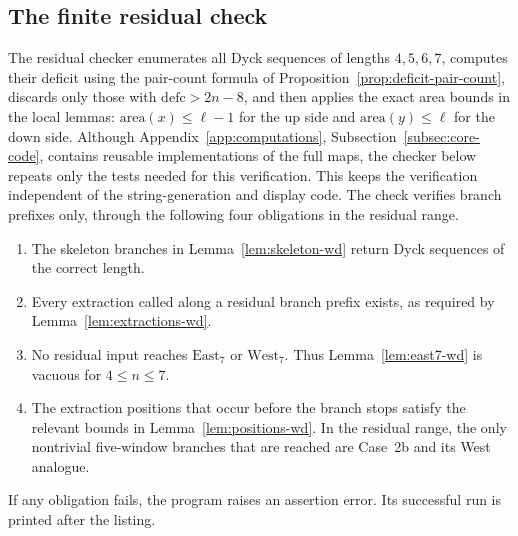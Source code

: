 \documentclass[11pt]{article}
\theoremstyle{plain}
\theoremstyle{definition}
\theoremstyle{remark}
\newcommand{\area}{\mathrm{area}}
\newcommand{\defc}{\mathrm{defc}}
\begin{document}
\subsection{The finite residual check}
\label{subsec:finite-residual-check}
The residual checker enumerates all Dyck sequences of lengths
\(4,5,6,7\), computes their deficit using the pair-count formula of
Proposition~\ref{prop:deficit-pair-count}, discards only those with
\(\defc>2n-8\), and then applies the exact area bounds in the local lemmas:
\(\area(x)\le \ell-1\) for the \(\mathrm{up}\) side and
\(\area(y)\le \ell\) for the \(\mathrm{down}\) side.  Although
Appendix~\ref{app:computations}, Subsection~\ref{subsec:core-code}, contains
reusable implementations of the full
maps, the checker below repeats only the tests needed for this verification.
This keeps the verification independent of the string-generation and display
code.
The check verifies branch prefixes only, through the following four obligations
in the residual range.
\begin{enumerate}[label=\textup{(\arabic*)}]
  \item The skeleton branches in Lemma~\ref{lem:skeleton-wd} return Dyck
  sequences of the correct length.
  \item Every extraction called along a residual branch prefix exists, as
  required by Lemma~\ref{lem:extractions-wd}.
  \item No residual input reaches \(\mathrm{East}_7\) or
  \(\mathrm{West}_7\).  Thus Lemma~\ref{lem:east7-wd} is vacuous for
  \(4\le n\le 7\).
  \item The extraction positions that occur before the branch stops satisfy the
  relevant bounds in Lemma~\ref{lem:positions-wd}.  In the residual range, the
  only nontrivial five-window branches that are reached are Case~2b and its
  West analogue.
\end{enumerate}
If any obligation fails, the program raises an assertion error.  Its successful
run is printed after the listing.
\end{document}
